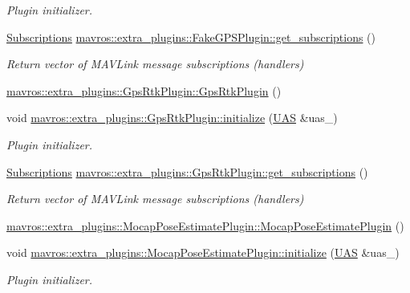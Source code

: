 \begin{DoxyCompactItemize}
\begin{DoxyCompactList}\small\item\em Plugin initializer. \end{DoxyCompactList}\item 
\mbox{\hyperlink{group__plugin_ga8967d61fc77040e0c3ea5a4585d62a09}{Subscriptions}} \mbox{\hyperlink{group__plugin_ga19cf673f75e3612d3e8d7b2cd316165e}{mavros\+::extra\+\_\+plugins\+::\+Fake\+G\+P\+S\+Plugin\+::get\+\_\+subscriptions}} ()
\begin{DoxyCompactList}\small\item\em Return vector of M\+A\+V\+Link message subscriptions (handlers) \end{DoxyCompactList}\item 
\mbox{\hyperlink{group__plugin_ga6a5cb4aec8a08bcfb3994274de9a085c}{mavros\+::extra\+\_\+plugins\+::\+Gps\+Rtk\+Plugin\+::\+Gps\+Rtk\+Plugin}} ()
\item 
void \mbox{\hyperlink{group__plugin_ga4d0ded3217149d886fba09768c5093ca}{mavros\+::extra\+\_\+plugins\+::\+Gps\+Rtk\+Plugin\+::initialize}} (\mbox{\hyperlink{classmavros_1_1UAS}{U\+AS}} \&uas\+\_\+)
\begin{DoxyCompactList}\small\item\em Plugin initializer. \end{DoxyCompactList}\item 
\mbox{\hyperlink{group__plugin_ga8967d61fc77040e0c3ea5a4585d62a09}{Subscriptions}} \mbox{\hyperlink{group__plugin_ga21af691b0770c7e0b87e5fd733b0145a}{mavros\+::extra\+\_\+plugins\+::\+Gps\+Rtk\+Plugin\+::get\+\_\+subscriptions}} ()
\begin{DoxyCompactList}\small\item\em Return vector of M\+A\+V\+Link message subscriptions (handlers) \end{DoxyCompactList}\item 
\mbox{\hyperlink{group__plugin_ga94fe2e9a154d9513005c3e89dbdad680}{mavros\+::extra\+\_\+plugins\+::\+Mocap\+Pose\+Estimate\+Plugin\+::\+Mocap\+Pose\+Estimate\+Plugin}} ()
\item 
void \mbox{\hyperlink{group__plugin_ga28f24bffc57ef681f8c61dfbcc53478c}{mavros\+::extra\+\_\+plugins\+::\+Mocap\+Pose\+Estimate\+Plugin\+::initialize}} (\mbox{\hyperlink{classmavros_1_1UAS}{U\+AS}} \&uas\+\_\+)
\begin{DoxyCompactList}\small\item\em Plugin initializer. \end{DoxyCompactList}\item 

\end{DoxyCompactItemize}
